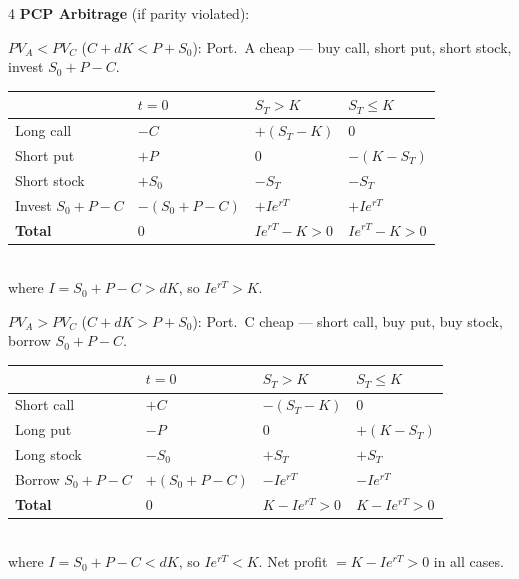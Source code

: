 \documentclass[6.5pt,landscape,a4paper]{extarticle}
\begin{document}
\begin{multicols*}{4}
  \textbf{PCP Arbitrage} (if parity violated):

  \textbf{$PV_A < PV_C$} ($C+dK < P+S_0$): Port.\ A cheap --- buy call, short put, short stock, invest $S_0+P-C$.\\
  {\tiny\begin{tabular}{@{}llll@{}}
    \toprule
                         & $t{=}0$          & $S_T{>}K$         & $S_T{\le}K$       \\
    \midrule
    Long call            & $-C$             & $+(S_T{-}K)$      & $0$               \\
    Short put            & $+P$             & $0$               & $-(K{-}S_T)$      \\
    Short stock          & $+S_0$           & $-S_T$            & $-S_T$            \\
    Invest $S_0{+}P{-}C$ & $-(S_0{+}P{-}C)$ & $+Ie^{rT}$        & $+Ie^{rT}$        \\
    \midrule
    \textbf{Total}       & $0$              & $Ie^{rT}{-}K{>}0$ & $Ie^{rT}{-}K{>}0$ \\
    \bottomrule
  \end{tabular}}\\
  where $I=S_0+P-C>dK$, so $Ie^{rT}>K$.

  \textbf{$PV_A > PV_C$} ($C+dK > P+S_0$): Port.\ C cheap --- short call, buy put, buy stock, borrow $S_0+P-C$.\\
  {\tiny\begin{tabular}{@{}llll@{}}
    \toprule
                         & $t{=}0$          & $S_T{>}K$         & $S_T{\le}K$       \\
    \midrule
    Short call           & $+C$             & $-(S_T{-}K)$      & $0$               \\
    Long put             & $-P$             & $0$               & $+(K{-}S_T)$      \\
    Long stock           & $-S_0$           & $+S_T$            & $+S_T$            \\
    Borrow $S_0{+}P{-}C$ & $+(S_0{+}P{-}C)$ & $-Ie^{rT}$        & $-Ie^{rT}$        \\
    \midrule
    \textbf{Total}       & $0$              & $K{-}Ie^{rT}{>}0$ & $K{-}Ie^{rT}{>}0$ \\
    \bottomrule
  \end{tabular}}\\
  where $I=S_0+P-C<dK$, so $Ie^{rT}<K$. Net profit $=K-Ie^{rT}>0$ in all cases.


\end{multicols*}
\end{document}

